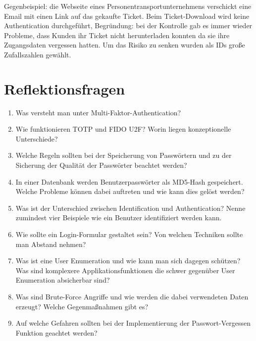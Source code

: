 Gegenbeispiel: die Webseite eines Personentransportunternehmens verschickt eine Email mit einen Link auf das gekaufte Ticket. Beim Ticket-Download wird keine Authentication durchgeführt, Begründung: bei der Kontrolle gab es immer wieder Probleme, dass Kunden ihr Ticket nicht herunterladen konnten da sie ihre Zugangsdaten vergessen hatten. Um das Risiko zu senken wurden als IDs große Zufallszahlen gewählt.

\section{Reflektionsfragen}

\begin{enumerate}
	\item Was versteht man unter Multi-Faktor-Authentication?
	\item Wie funktionieren TOTP und FIDO U2F? Worin liegen konzeptionelle Unterschiede?
	\item Welche Regeln sollten bei der Speicherung von Passwörtern und zu der Sicherung der Qualität der Passwörter beachtet werden?
	\item In einer Datenbank werden Benutzerpasswörter als MD5-Hash gespeichert. Welche Probleme können dabei auftreten und wie kann dies gelöst werden?
	\item Was ist der Unterschied zwischen Identification und Authentication? Nenne zumindest vier Beispiele wie ein Benutzer identifiziert werden kann.
	\item Wie sollte ein Login-Formular gestaltet sein? Von welchen Techniken sollte man Abstand nehmen?
	\item Was ist eine User Enumeration und wie kann man sich dagegen schützen? Was sind komplexere Applikationsfunktionen die schwer gegenüber User Enumeration absicherbar sind?
	\item Was sind Brute-Force Angriffe und wie werden die dabei verwendeten Daten erzeugt? Welche Gegenmaßnahmen gibt es?
	\item Auf welche Gefahren sollten bei der Implementierung der Passwort-Vergessen Funktion geachtet werden?
\end{enumerate}

